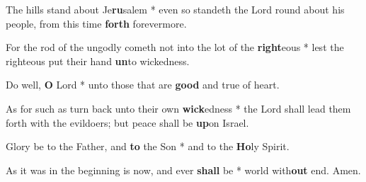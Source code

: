 \begin{multicols}{2}
	The hills stand about Je\textbf{ru}salem * even so standeth the Lord round about his people, from this time \textbf{forth} forevermore.
	
	For the rod of the ungodly cometh not into the lot of the \textbf{right}eous * lest the righteous put their hand \textbf{un}to wickedness.
	
	Do well, \textbf{O} Lord * unto those that are \textbf{good} and true of heart.
	
	As for such as turn back unto their own \textbf{wick}edness * the Lord shall lead them forth with the evildoers; but peace shall be \textbf{up}on Israel.
	
	Glory be to the Father, and \textbf{to} the Son * and to the \textbf{Ho}ly Spirit.
	
	As it was in the beginning is now, and ever \textbf{shall} be * world with\textbf{out} end. Amen.
\end{multicols}